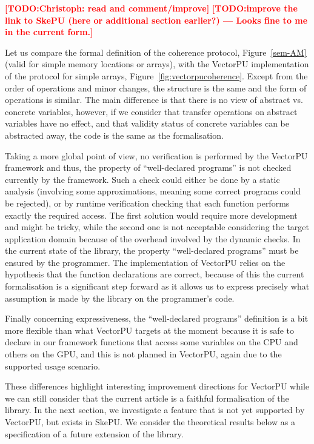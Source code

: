 \documentclass[preprint,12pt]{elsarticle}
\newcommand{\TODO}[1]{\textcolor{red}{\textbf{[TODO:#1]}}}
\begin{document}
\TODO{Christoph: read and comment/improve}
\TODO{improve the link to SkePU (here or additional section earlier?) --- Looks fine to me in the current form.}

Let us compare the formal definition of the coherence protocol, Figure~\ref{sem-AM} (valid for simple memory locations or arrays), with the VectorPU implementation of the protocol for simple arrays, Figure~\ref{fig:vectorpucoherence}. Except from the order of operations and minor changes, the structure is the same and the form of operations is similar. The main difference is that there is no view of abstract vs. concrete variables, however, if we consider that transfer operations on abstract variables have no effect, and that validity status of concrete variables can be abstracted away, the code is  the same as the formalisation. 

Taking a more global point of view, no verification is performed by the VectorPU framework and thus, the property of ``well-declared programs'' is not checked currently by the framework. Such a check could either be done by a static analysis (involving some approximations, meaning  some correct programs could be rejected), or by runtime verification checking that each function performs exactly the required access. The first solution would require more development and might be tricky, while the second one is not acceptable considering the target application domain because of the overhead involved by the dynamic checks. In the current state of the library, the property ``well-declared programs''  must be ensured by the programmer. The implementation of VectorPU relies on the hypothesis that the function declarations are correct, because of this the current formalisation is a significant step forward as it allows us to express precisely what assumption is made by the library on the programmer's code.

Finally concerning expressiveness, the ``well-declared programs'' definition is a bit more flexible than what VectorPU targets at the moment because it is safe to declare in our framework functions that access some variables on the CPU and others on the GPU, and this is not planned in VectorPU, again due to the supported usage scenario.

These differences highlight interesting improvement directions for VectorPU while we can still consider that the current article  is a faithful formalisation of the library. In the next section, we investigate a feature that is not yet supported by VectorPU, but exists in SkePU. We consider the theoretical results below as a specification of a future extension of the library.
\end{document}
